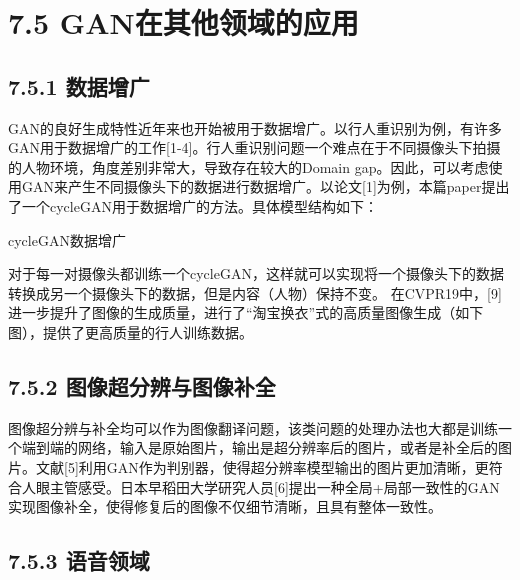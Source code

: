 \section{7.5
GAN在其他领域的应用}\label{ganux5728ux5176ux4ed6ux9886ux57dfux7684ux5e94ux7528}

\subsection{7.5.1 数据增广}\label{ux6570ux636eux589eux5e7f}

​
GAN的良好生成特性近年来也开始被用于数据增广。以行人重识别为例，有许多GAN用于数据增广的工作{[}1-4{]}。行人重识别问题一个难点在于不同摄像头下拍摄的人物环境，角度差别非常大，导致存在较大的Domain
gap。因此，可以考虑使用GAN来产生不同摄像头下的数据进行数据增广。以论文{[}1{]}为例，本篇paper提出了一个cycleGAN用于数据增广的方法。具体模型结构如下：

\caption{cycleGAN数据增广}

​
对于每一对摄像头都训练一个cycleGAN，这样就可以实现将一个摄像头下的数据转换成另一个摄像头下的数据，但是内容（人物）保持不变。
在CVPR19中，{[}9{]}进一步提升了图像的生成质量，进行了``淘宝换衣''式的高质量图像生成（如下图），提供了更高质量的行人训练数据。


\subsection{7.5.2
图像超分辨与图像补全}\label{ux56feux50cfux8d85ux5206ux8fa8ux4e0eux56feux50cfux8865ux5168}

​
图像超分辨与补全均可以作为图像翻译问题，该类问题的处理办法也大都是训练一个端到端的网络，输入是原始图片，输出是超分辨率后的图片，或者是补全后的图片。文献{[}5{]}利用GAN作为判别器，使得超分辨率模型输出的图片更加清晰，更符合人眼主管感受。日本早稻田大学研究人员{[}6{]}提出一种全局+局部一致性的GAN实现图像补全，使得修复后的图像不仅细节清晰，且具有整体一致性。

\subsection{7.5.3 语音领域}\label{ux8bedux97f3ux9886ux57df}

